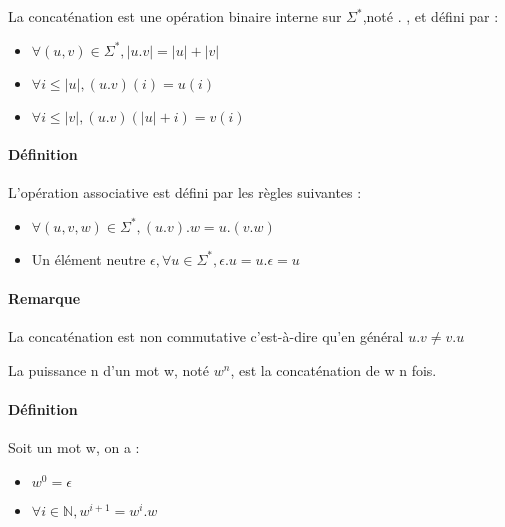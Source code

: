 La concaténation est une opération binaire interne sur $\Sigma^*$,noté . , et défini par :
	
	\begin{itemize}
		\item $\forall(u,v)\in \Sigma^*, \left|u.v\right|=\left|u\right|+\left|v\right|$
		\item $\forall i\leq \left|u\right|,(u.v)(i)=u(i)$
		\item $\forall i\leq \left|v\right|,(u.v)(\left|u\right|+i)=v(i)$
	\end{itemize}



\paragraph{Définition} %
\label{par:d_finition}

L'opération associative est défini par les règles suivantes :

	\begin{itemize}
		\item $\forall(u,v,w) \in \Sigma^*,(u.v).w=u.(v.w)$
		\item Un élément neutre $\epsilon, \forall u \in \Sigma^*, \epsilon.u=u.\epsilon=u$
	\end{itemize}



\paragraph{Remarque} %
\label{par:remarque}

La concaténation est non commutative c'est-à-dire qu'en général $u.v \neq v.u$



La puissance n d'un mot w, noté $w^n$, est la concaténation de w n fois.

\paragraph{Définition} %
\label{par:d_finition}
Soit un mot w, on a :

\begin{itemize}
	\item $w^0 = \epsilon$
	\item $\forall i \in \mathbb{N} , w^{i+1}=w^i.w$
\end{itemize}


